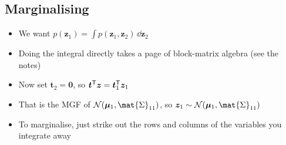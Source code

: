 \begin{slide}
\section[-2]{Marginalising}

\begin{PauseHighLight}
  \begin{itemize}\squeeze
  \item We want $p(\bm{z}_1) = \int p(\bm{z}_1,\bm{z}_2)\,\dd\bm{z}_2$\pause
  \item Doing the integral directly takes a page of block-matrix
    algebra (see the notes)\pause
  \item \leavevmode\pausenomark{}\pausenomark
    Now set $\bm{t}_2 = \bm{0}$, so
    $\bm{t}^{\textsf{T}}\bm{z} = \bm{t}_1^{\textsf{T}}\bm{z}_1$\pausenomark
    \begin{center}
      \pausenomark
      \pause
    \end{center}
  \item That is the MGF of $\mathcal{N}(\bm{\mu}_1,\mat{\Sigma}_{11})$, so
    $\bm{z}_1 \sim \mathcal{N}(\bm{\mu}_1,\mat{\Sigma}_{11})$\pause
  \item To marginalise, just strike out the rows and columns of the
    variables you integrate away\pause
  \end{itemize}
\end{PauseHighLight}

\end{slide}

